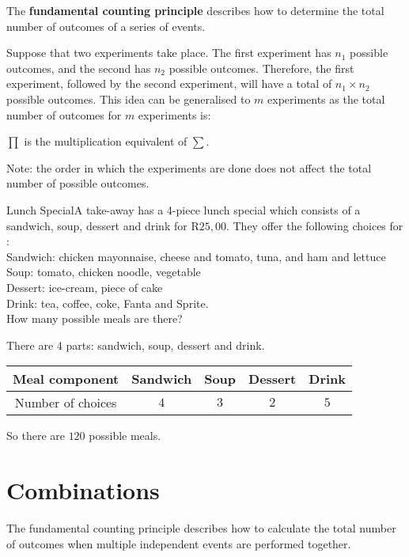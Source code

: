 The \textbf{fundamental counting principle} describes how to determine the total number of outcomes of a series of events.

Suppose that two experiments take place. The first experiment has $n_1$ possible outcomes, and the second has $n_2$ possible outcomes. Therefore, the first experiment, followed by the second experiment, will have a total of $n_1\times n_2$ possible outcomes. This idea can be generalised to $m$ experiments as the total number of outcomes for $m$ experiments is:

$\prod$ is the multiplication equivalent of $\sum$.

Note: the order in which the experiments are done does not affect the total number of possible outcomes.

\begin{wex}{Lunch Special}{A take-away has a 4-piece lunch special which consists of a sandwich, soup, dessert and drink for R$25,00$. They offer the following choices for :\\
Sandwich: chicken mayonnaise, cheese and tomato, tuna, and ham and lettuce\\
Soup: tomato, chicken noodle, vegetable\\
Dessert: ice-cream, piece of cake\\
Drink: tea, coffee, coke, Fanta and Sprite.\\
How many possible meals are there?}
{
There are 4 parts: sandwich, soup, dessert and drink.

\begin{center}
\begin{tabular}{|c|c|c|c|c|}\hline
Meal component & Sandwich & Soup & Dessert & Drink\\\hline
Number of choices & $4$ & $3$ & $2$ & $5$\\\hline
\end{tabular}
\end{center}


So there are $120$ possible meals.}
\end{wex}

\section{Combinations}
The fundamental counting principle describes how to calculate the total number of outcomes when multiple independent events are performed together.

